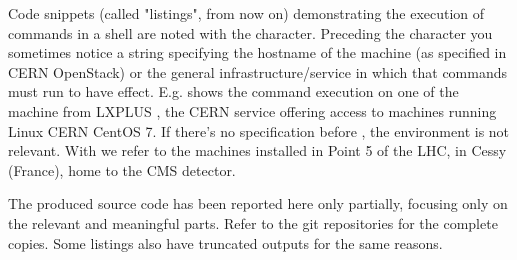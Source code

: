 Code snippets (called "listings", from now on) demonstrating the execution of commands in a shell are noted with the \mcode{\$} character. Preceding the \mcode{\$} character you sometimes notice a string specifying the hostname of the machine (as specified in CERN OpenStack) or the general infrastructure/service in which that commands must run to have effect. E.g.  shows the command execution on one of the machine from LXPLUS \cite{LXPLUSServiceITDepartment-2020-10-01}, the CERN service offering access to machines running Linux CERN CentOS 7. If there's no specification before \mcode{\$}, the environment is not relevant. With  we refer to the machines installed in Point 5 of the LHC, in Cessy (France), home to the CMS detector.

The produced source code has been reported here only partially, focusing only on the relevant and meaningful parts. Refer to the git repositories for the complete copies. Some listings also have truncated outputs for the same reasons.